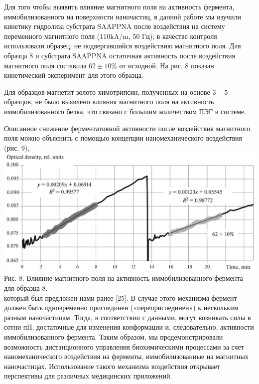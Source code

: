 \documentclass[10pt, a4paper]{article}
\begin{document}
  Для того чтобы выявить влияние магнитного поля на активность фермента, иммобилизованного на поверхности наночастиц, в данной работе мы изучили кинетику гидролиза субстрата SAAPPNA после воздействия на систему переменного магнитного поля (\(110 \mathrm{kA} / \mathrm{m}\), 50 Гц); в качестве контроля использовали образец, не подвергавшийся воздействию магнитного поля. Для образца 8 и субстрата SAAPPNA остаточная активность после воздействия магнитного поля составила \(62 \pm 10 \%\) от исходной. На рис. 8 показан кинетический эксперимент для этого образца.
  
  Для образцов магнетит-золото-химотрипсин, полученных на основе \(3-5\) образцов, не было выявлено влияния магнитного поля на активность иммобилизованного белка, что связано с большим количеством ПЭГ в системе.
  
  Описанное снижение ферментативной активности после воздействия магнитного поля можно объяснить с помощью концепции наномеханического воздействия (рис. 9),\\
  \includegraphics[scale=0.35, center]{2024_10_23_dfdc0589534473f41785g-8(1)}
  Рис. 8. Влияние магнитного поля на активность иммобилизованного фермента для образца 8.\\
  который был предложен нами ранее [25]. В случае этого механизма фермент должен быть одновременно присоединен («переприсоединен») к нескольким разным наночастицам. Тогда, в соответствии с данными, могут возникать силы в сотни пН, достаточные для изменения конформации и, следовательно, активности иммобилизованного фермента.
  Таким образом, мы продемонстрировали возможность дистанционного управления биохимическими процессами за счет наномеханического воздействия на ферменты, иммобилизованные на магнитных наночастицах. Использование такого механизма воздействия открывает перспективы для различных медицинских приложений.\\
\end{document}
